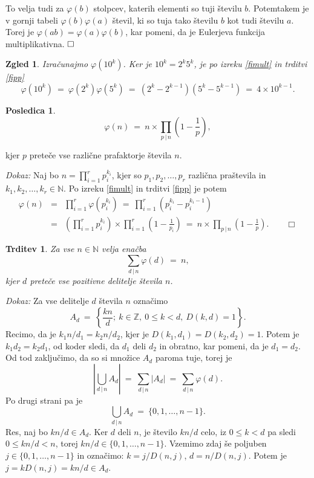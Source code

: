 \documentclass[a4paper,12pt]{article}
\def\N{\mathbb{N}} %
\def\Z{\mathbb{Z}} %
\def\qed{$\hfill\Box$}   %
\def\qedm{\qquad\Box}   %
\newtheorem{trditev}{Trditev}
\newtheorem{posledica}{Posledica}
\newtheorem{zgled}{Zgled}
\begin{document}
To velja tudi za $\varphi(b)$ stolpcev, katerih elementi so tuji številu $b$. Potemtakem je v gornji tabeli
$\varphi(b)\varphi(a)$ števil, ki so tuja tako številu $b$ kot tudi številu $a$. 
Torej je $\varphi(ab) = \varphi(a)\varphi(b)$, kar pomeni, da je Eulerjeva funkcija multiplikativna. \qed


\begin{zgled}
Izračunajmo $\varphi(10^k)$. Ker je $10^k = 2^k 5^k$, je po izreku \ref{fimult} in trditvi \ref{fipp}
\[
\varphi(10^k)\ =\ \varphi(2^k)\varphi(5^k)\ =\ (2^k - 2^{k-1})(5^k - 5^{k-1})\ =\ 4\times 10^{k-1}.
\]
\end{zgled}


\begin{posledica}
\[
\varphi(n)\ =\ n \times \prod_{p\,|\,n} \left(1 - \frac{1}{p}\right),
\]
\end{posledica}
kjer $p$ preteče vse različne prafaktorje števila $n$.

\noindent
{\em Dokaz:\/} Naj bo $n = \prod_{i=1}^r p_i^{k_i}$,
kjer so $p_1, p_2, \ldots, p_r$ različna praštevila in $k_1, k_2, \ldots, k_r \in \N$. Po izreku 
\ref{fimult} in trditvi \ref{fipp} je potem
\begin{eqnarray*}
\varphi(n) &=& \prod_{i=1}^r \varphi\left(p_i^{k_i}\right)
\ =\ \prod_{i=1}^r \left(p_i^{k_i} - p_i^{k_i-1}\right) \\
 &=& \left(\prod_{i=1}^r p_i^{k_i}\right) \times \prod_{i=1}^r \left(1 - \frac{1}{p_i}\right)
\ =\ n \times \prod_{p\,|\,n} \left(1 - \frac{1}{p}\right). \qedm
\end{eqnarray*}


\begin{trditev}
Za vse $n \in \N$ velja enačba
\begin{equation}
\label{fisum}
\sum_{d\,|\,n} \varphi(d)\ =\  n,
\end{equation}
kjer $d$ preteče vse pozitivne delitelje števila $n$.
\end{trditev}

\noindent
{\em Dokaz:\/} Za vse delitelje $d$ števila $n$ označimo
\[
A_d\ =\ \left\{\frac{k n}{d};\ k \in \Z,\ 0 \le k < d,\ D(k,d) = 1\right\}.
\]
Recimo, da je $k_1 n/d_1 = k_2 n/d_2$, kjer je $D(k_1,d_1) = D(k_2,d_2) = 1$. Potem 
je $k_1 d_2 = k_2 d_1$, od koder sledi, da $d_1$ deli $d_2$ in obratno, kar pomeni,
da je $d_1 = d_2$. Od tod zaključimo, da so si množice $A_d$ paroma tuje,
torej je
\[
\left|\bigcup_{d\,|\,n} A_d\right|\ =\ \sum_{d\,|\,n} |A_d|\ =\ \sum_{d\,|\,n} \varphi(d).
\]
Po drugi strani pa je
\[
\bigcup_{d\,|\,n} A_d\ =\ \{0, 1, \ldots, n-1\}.
\]
Res, naj bo $k n/d \in A_d$. Ker $d$ deli $n$, je število $k n/d$ celo, iz $0 \le k < d$ pa sledi $0 \le k n/d < n$,
torej $k n/d \in \{0, 1, \ldots, n-1\}$. Vzemimo zdaj še poljuben $j \in \{0, 1, \ldots, n-1\}$
in označimo: $k = j/D(n,j)$, $d = n/D(n,j)$. Potem je $j = k D(n,j) = k n/d \in A_d$.
\end{document}

